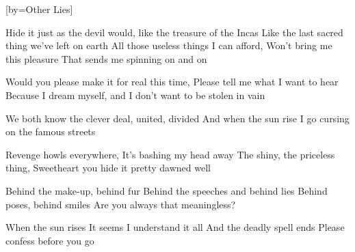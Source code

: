[by={Other Lies}]

  \chordsoff
  \beginverse
  Hide it just as the devil would,
  like the treasure of the Incas
  Like the last sacred thing we've left on earth
  All those useless things I can afford,
  Won’t bring me this pleasure
  That sends me spinning on and on
  \endverse
  
  \beginchorus
  Would you please make it for real this time,
  Please tell me what I want to hear 
  Because I dream myself,
  and I don't want to be stolen in vain
  
  We both know the clever deal, united, divided
  And when the sun rise I go cursing on the famous streets 
  \endchorus
  
  \beginverse
  Revenge howls everywhere,
  It’s bashing my head away
  The shiny, the priceless thing, 
  Sweetheart you hide it pretty dawned well 
  \endverse

  \beginverse
  Behind the make-up, behind fur 
  Behind the speeches and behind lies
  Behind poses, behind smiles
  Are you always that meaningless?
  \endverse

  \beginverse
  When the sun rises
  It seems I understand it all
  And the deadly spell ends
  Please confess before you go
  \endverse
\endsong

